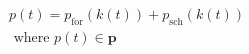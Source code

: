 \begin{equation}
\begin{split}
	p(t) = p_\text{for}(k(t)) + p_\text{sch}(k(t))\\
	\text{ where } p(t) \in \textbf{p}
\end{split}
\label{ch2:equ:notation-simplification}
\end{equation}